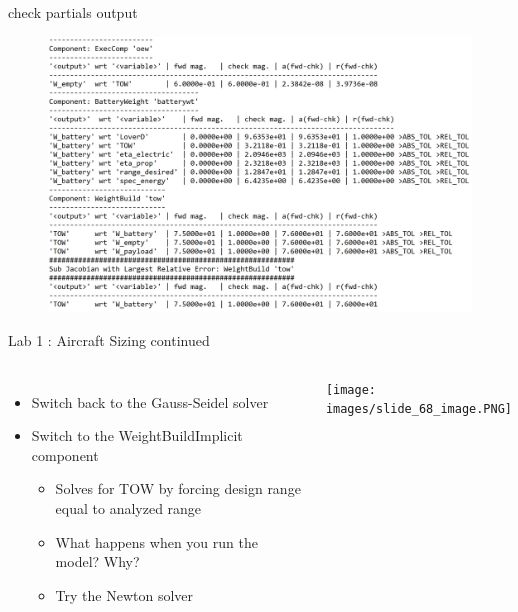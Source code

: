 \documentclass[aspectratio=169, usenames,dvipsnames, 14pt]{beamer}
\begin{document}
\begin{frame}{check partials output}

\begin{figure}
\includegraphics[scale=0.45]{images/slide_37_derivatives.PNG}
\end{figure}
    
\end{frame}


\begin{frame}{Lab 1 : Aircraft Sizing continued}
    \begin{columns}
    \hspace{-1cm}
    
            \begin{itemize}
                \item Switch back to the Gauss-Seidel solver
                
                \vspace{0.25cm}
                \item Switch to the WeightBuildImplicit component

                    \begin{itemize}
                        \item Solves for TOW by forcing design range equal to analyzed range
                        \item What happens when you run the model? Why?
                        \item Try the Newton solver
                    \end{itemize}
            \end{itemize}
            
            \texttt{[image: images/slide\_68\_image.PNG]}
    \end{columns}
\end{frame}
    
\end{document}
